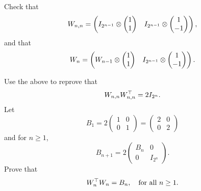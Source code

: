 \documentclass[12pt]{article}
\begin{document}
\medskip
Check that
\[
W_{n, n} =
\begin{pmatrix}
I_{2^{n-1}} \otimes 
\begin{pmatrix}
1 \\
1
\end{pmatrix}
& 
I_{2^{n-1}} \otimes 
\begin{pmatrix}
1 \\
-1
\end{pmatrix}
\end{pmatrix} ,
\]
and that
\[
W_{n} =
\begin{pmatrix}
W_{n-1} \otimes 
\begin{pmatrix}
1 \\
1
\end{pmatrix}
& 
I_{2^{n-1}} \otimes 
\begin{pmatrix}
1 \\
-1
\end{pmatrix}
\end{pmatrix} .
\]


\medskip
Use the above to reprove that
\[
W_{n, n}W_{n, n}^{\top} = 2I_{2^n}.
\]
Let
\[
B_1 =
2
\begin{pmatrix}
1 & 0 \\
0 & 1
\end{pmatrix}
= 
\begin{pmatrix}
2 & 0 \\
0 & 2
\end{pmatrix}
\]
and for $n \geq 1$,
\[
B_{n+1} =
2
\begin{pmatrix}
B_n & 0 \\
0 & I_{2^n}
\end{pmatrix}.
\]
Prove that
\[
W_n^{\top} W_n = B_n, \quad\hbox{for all $n \geq 1$}.
\]
\end{document}
